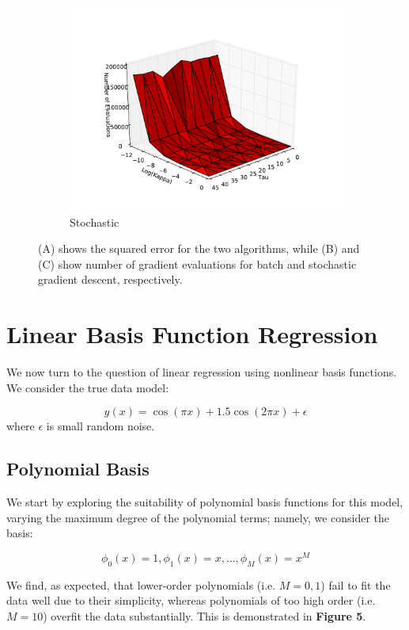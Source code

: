 \documentclass[10pt,psamsfonts]{amsart}
\theoremstyle{definition}
\theoremstyle{remark}
\numberwithin{equation}{section}
\begin{document}
\begin{figure}
\begin{subfigure}[b]{0.3\textwidth}
			\includegraphics[width=\textwidth]{hw1_1-3_timeSGD.pdf}
			\caption{Stochastic}
		\end{subfigure}			
	\caption{(A) shows the squared error for the two algorithms, while (B) and (C) show number of gradient evaluations for batch and stochastic gradient descent, respectively.}
\end{figure}

\section{Linear Basis Function Regression}

We now turn to the question of linear regression using nonlinear basis functions. We consider the true data model:

$$y(x) = \cos(\pi x) + 1.5 \cos(2\pi x) + \epsilon$$
where $\epsilon$ is small random noise.

\subsection{Polynomial Basis} We start by exploring the suitability of polynomial basis functions for this model, varying the maximum degree of the polynomial terms; namely, we consider the basis:

$$\phi_0(x) = 1, \phi_1(x) = x, \dots, \phi_M(x) = x^M$$

We find, as expected, that lower-order polynomials (i.e. $M = 0, 1$) fail to fit the data well due to their simplicity, whereas polynomials of too high order (i.e. $M = 10$) overfit the data substantially. This is demonstrated in {\bf Figure 5}.
\end{document}
